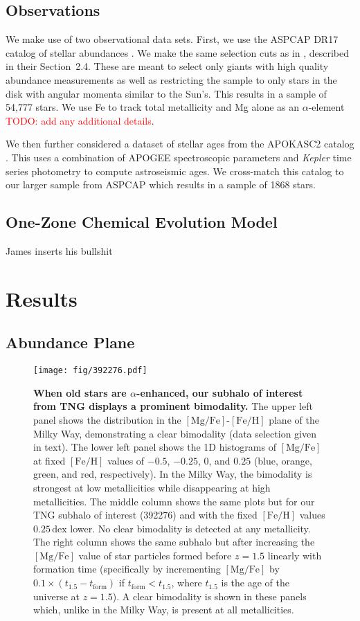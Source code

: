 \documentclass[linenumbers, twocolumn]{aastex631}
\newcommand{\FeH}{\ensuremath{[\textrm{Fe}/\textrm{H}]}}
\newcommand{\MgFe}{\ensuremath{[\textrm{Mg}/\textrm{Fe}]}}
\newcommand{\dex}{\ensuremath{\textrm{dex}}}
\newcommand{\red}[1]{\textcolor{red}{#1}}
\begin{document}
\subsection{Observations}\label{ssec:obs}
We make use of two observational data sets. First, we use the ASPCAP DR17 catalog of stellar abundances \citep[][J.A.~Holtzman et al., in preparation]{2016AJ....151..144G}. We make the same selection cuts as in \citet{2024arXiv240707985B}, described in their Section~2.4. These are meant to select only giants with high quality abundance measurements as well as restricting the sample to only stars in the disk with angular momenta similar to the Sun's. This results in a sample of 54,777 stars. We use Fe to track total metallicity and Mg alone as an $\alpha$-element \red{TODO: add any additional details}.

We then further considered a dataset of stellar ages from the APOKASC2 catalog \citep{2018ApJS..239...32P}. This uses a combination of APOGEE spectroscopic parameters and \textit{Kepler} time series photometry to compute astroseismic ages. We cross-match this catalog to our larger sample from ASPCAP which results in a sample of 1868 stars.

\subsection{One-Zone Chemical Evolution Model}\label{ssec:onezone_met}
James inserts his bullshit

\section{Results}\label{sec:results}
\subsection{Abundance Plane}\label{ssec:plane}

\begin{figure*}
  \centering
  \texttt{[image: fig/392276.pdf]}
  \caption{\textbf{When old stars are $\alpha$-enhanced, our subhalo of interest from TNG displays a prominent bimodality.} The upper left panel shows the distribution in the \MgFe{}-\FeH{} plane of the Milky Way, demonstrating a clear bimodality (data selection given in text). The lower left panel shows the 1D histograms of \MgFe{} at fixed \FeH{} values of $-0.5$, $-0.25$, $0$, and $0.25$ (blue, orange, green, and red, respectively). In the Milky Way, the bimodality is strongest at low metallicities while disappearing at high metallicities. The middle column shows the same plots but for our TNG subhalo of interest (392276) and with the fixed \FeH{} values $0.25\,\dex$ lower. No clear bimodality is detected at any metallicity. The right column shows the same subhalo but after increasing the \MgFe{} value of star particles formed before $z=1.5$ linearly with formation time (specifically by incrementing \MgFe{} by $0.1\times\left(t_{1.5}-t_{\textrm{form}}\right)$ if $t_{\textrm{form}} < t_{1.5}$, where $t_{1.5}$ is the age of the universe at $z=1.5$). A clear bimodality is shown in these panels which, unlike in the Milky Way, is present at all metallicities.}
  \label{fig:fig1}
\end{figure*}
\end{document}
